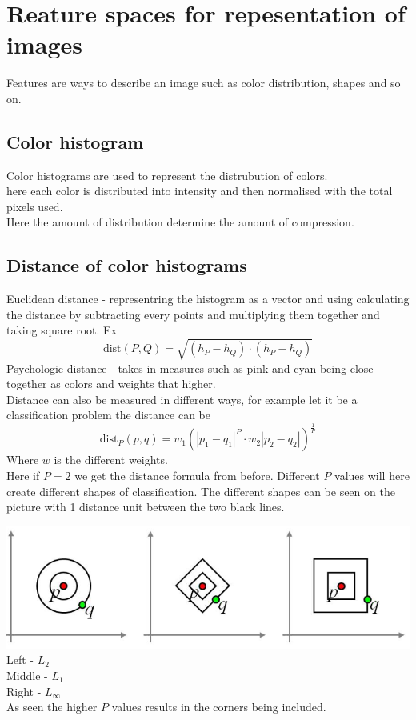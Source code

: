 \documentclass[12pt, a4paper]{article}
\begin{document}
		\section{Reature spaces for repesentation of images}
			Features are ways to describe an image such as color distribution, shapes and so on.
			\subsection{Color histogram}
				Color histograms are used to represent the distrubution of colors.\\
				here each color is distributed into intensity and then normalised with the total pixels used.\\
				Here the amount of distribution determine the amount of compression.\\
			\subsection{Distance of color histograms}
				Euclidean distance - representring the histogram as a vector and using calculating the distance by subtracting every points and multiplying them together and taking square root. Ex $$\text{dist}(P,Q)=\sqrt{(h_P-h_Q)\cdot (h_P-h_Q)}$$
				Psychologic distance - takes in measures such as pink and cyan being close together as colors and weights that higher.\\
				Distance can also be measured in different ways, for example let it be a classification problem the distance can be  $$\text{dist}_P(p,q)=w_1(|p_1-q_1|^P\cdot w_2|p_2-q_2|)^{\frac{1}{P}}$$ Where $w$ is the different weights.\\
				Here if $P=2$ we get the distance formula from before. Different $P$ values will here create different shapes of classification. The different shapes can be seen on the picture with 1 distance unit between the two black lines.\\
				\begin{center}
					\includegraphics[width=\textwidth]{assets/distanceFormula.png}\\
					Left - $L_2$ \\
					Middle - $L_1$\\
					Right - $L_{\infty}$\\
					As seen the higher $P$ values results in the corners being included.
				\end{center}
				
\end{document}
